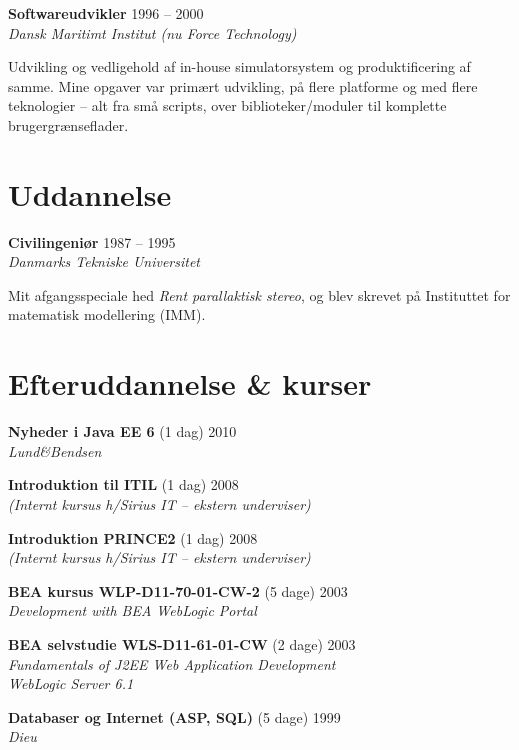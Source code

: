 \documentclass[a4paper,11pt]{article}
\begin{document}
\smallskip

\textbf{Softwareudvikler} \hfill 1996 -- 2000 \\
\textsl{Dansk Maritimt Institut (nu Force Technology)}

Udvikling og vedligehold af in-house simulatorsystem og
produktificering af samme. Mine opgaver var primært udvikling, på
flere platforme og med flere teknologier – alt fra små scripts, over
biblioteker/moduler til komplette brugergrænseflader.


\section*{Uddannelse}

\textbf{Civilingeniør} \hfill 1987 -- 1995 \\
\textsl{Danmarks Tekniske Universitet}

Mit afgangsspeciale hed \textit{Rent parallaktisk stereo}, og blev
skrevet på Instituttet for matematisk modellering (IMM).


\section*{Efteruddannelse \& kurser}

\textbf{Nyheder i Java EE 6} \hfill (1 dag) 2010 \\
\textsl{Lund\&Bendsen}

\textbf{Introduktion til ITIL} \hfill (1 dag) 2008 \\
\textsl{(Internt kursus h/Sirius IT -- ekstern underviser)}

\textbf{Introduktion PRINCE2} \hfill (1 dag) 2008 \\
\textsl{(Internt kursus h/Sirius IT -- ekstern underviser)}

\textbf{BEA kursus WLP-D11-70-01-CW-2} \hfill (5 dage) 2003 \\
\textsl{Development with BEA WebLogic Portal}

\textbf{BEA selvstudie WLS-D11-61-01-CW} \hfill (2 dage) 2003 \\
\textsl{Fundamentals of J2EE Web Application Development\\WebLogic Server 6.1}


\textbf{Databaser og Internet (ASP, SQL)} \hfill (5 dage) 1999 \\
\textsl{Dieu}
\end{document}
